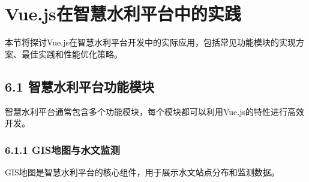 \section{Vue.js在智慧水利平台中的实践}\label{vue.jsux5728ux667aux6167ux6c34ux5229ux5e73ux53f0ux4e2dux7684ux5b9eux8df5}

本节将探讨Vue.js在智慧水利平台开发中的实际应用，包括常见功能模块的实现方案、最佳实践和性能优化策略。

\subsection{6.1
智慧水利平台功能模块}\label{ux667aux6167ux6c34ux5229ux5e73ux53f0ux529fux80fdux6a21ux5757}

智慧水利平台通常包含多个功能模块，每个模块都可以利用Vue.js的特性进行高效开发。

\subsubsection{6.1.1
GIS地图与水文监测}\label{gisux5730ux56feux4e0eux6c34ux6587ux76d1ux6d4b}

GIS地图是智慧水利平台的核心组件，用于展示水文站点分布和监测数据。

